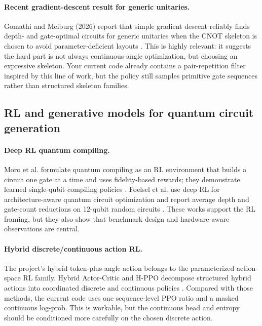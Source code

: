 \documentclass[11pt,a4paper]{article}
\begin{document}
\paragraph{Recent gradient-descent result for generic unitaries.}
Gomathi and Meiburg (2026) report that simple gradient descent reliably finds
depth- and gate-optimal circuits for generic unitaries when the CNOT skeleton
is chosen to avoid parameter-deficient layouts \cite{gomathi2026gd}. This is
highly relevant: it suggests the hard part is not always continuous-angle
optimization, but choosing an expressive skeleton. Your current code already
contains a pair-repetition filter inspired by this line of work, but the
policy still samples primitive gate sequences rather than structured
skeleton families.

\subsection{RL and generative models for quantum circuit generation}

\paragraph{Deep RL quantum compiling.}
Moro et al. formulate quantum compiling as an RL environment that builds a
circuit one gate at a time and uses fidelity-based rewards; they demonstrate
learned single-qubit compiling policies \cite{moro2021drl}. Foelsel et al.
use deep RL for architecture-aware quantum circuit optimization and report
average depth and gate-count reductions on 12-qubit random circuits
\cite{fosel2021rl}. These works support the RL framing, but they also show
that benchmark design and hardware-aware observations are central.

\paragraph{Hybrid discrete/continuous action RL.}
The project's hybrid token-plus-angle action belongs to the parameterized
action-space RL family. Hybrid Actor-Critic and H-PPO decompose structured
hybrid actions into coordinated discrete and continuous policies
\cite{fan2019hppo}. Compared with those methods, the current code uses one
sequence-level PPO ratio and a masked continuous log-prob. This is workable,
but the continuous head and entropy should be conditioned more carefully on
the chosen discrete action.
\end{document}
